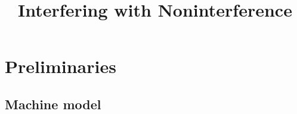 \documentclass[conference]{IEEEtran}
\newif\ifdraft \drafttrue
\newif\iftext \textfalse
\newcommand{\bcp}[1]{\ifdraft\textcolor{violet}{{[BCP:~#1]}}\fi}
\begin{document}
\title{Interfering with Noninterference
\iftext\thanks{\bcp{Identify applicable funding agencies here (DARPA and NSF
    and...?)}}\fi
}

\iftext
\IEEEauthorblockN{Leonidas Lampropoulos}
\IEEEauthorblockA{\textit{University of Maryland \bcp{right?}}
  }
\and
\author{\IEEEauthorblockN{Roberto Blanco}
\IEEEauthorblockA{\textit{\bcp{affiliation?}}
}
\and
\IEEEauthorblockN{Benjamin C. Pierce}
\IEEEauthorblockA{\textit{University of Pennsylvania}
  }
\and
\IEEEauthorblockN{Andrew Tolmach}
\IEEEauthorblockA{\textit{Portland State University}
}
}
\fi

\maketitle

\iftext
\begin{abstract}
\end{abstract}

\begin{IEEEkeywords}
\end{IEEEkeywords}
\fi

\iftext
\section{Introduction}

\bcp{How about coining the term ``lockstep noninterference'' and then saying
that we study several variants...?}

\fi

\section{Preliminaries}

\subsection{Machine model}
\end{document}
